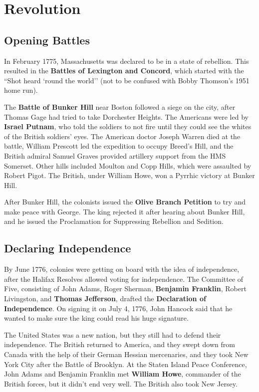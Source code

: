 \section{Revolution}

\subsection*{Opening Battles}

In February 1775, Massachusetts was declared to be in a state of rebellion.
This resulted in the \textbf{Battles of Lexington and Concord},
which started with the ``Shot heard `round the world''
(not to be confused with Bobby Thomson's 1951 home run).

The \textbf{Battle of Bunker Hill} near Boston followed a siege on the city,
after Thomas Gage had tried to take Dorchester Heights.
The Americans were led by \textbf{Israel Putnam}, who told the soldiers to
not fire until they could see the whites of the British soldiers' eyes.
The American doctor Joseph Warren died at the battle,
William Prescott led the expedition to occupy Breed's Hill,
and the British admiral Samuel Graves provided artillery support from the HMS Somerset.
Other hills included Moulton and Copp Hills, which were assaulted by Robert Pigot.
The British, under William Howe, won a Pyrrhic victory at Bunker Hill.

After Bunker Hill, the colonists issued the \textbf{Olive Branch Petition} to try and make peace with George.
The king rejected it after hearing about Bunker Hill,
and he issued the Proclamation for Suppressing Rebellion and Sedition.

\subsection*{Declaring Independence}

By June 1776, colonies were getting on board with the idea of independence,
after the Halifax Resolves allowed voting for independence.
The Committee of Five, consisting of
John Adams,
Roger Sherman,
\textbf{Benjamin Franklin},
Robert Livingston,
and \textbf{Thomas Jefferson},
drafted the \textbf{Declaration of Independence}.
On signing it on July 4, 1776,
John Hancock said that he wanted to make sure the king could read his huge signature.

The United States was a new nation, but they still had to defend their independence.
The British returned to America, and they swept down from Canada with the help of their German Hessian mercenaries,
and they took New York City after the Battle of Brooklyn.
At the Staten Island Peace Conference, John Adams and Benjamin Franklin met \textbf{William Howe},
commander of the British forces, but it didn't end very well.
The British also took New Jersey.

